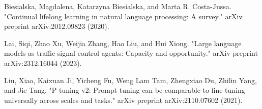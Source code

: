 \documentclass[runningheads]{llncs}
\begin{document}
\begin{thebibliography}{8}
Biesialska, Magdalena, Katarzyna Biesialska, and Marta R. Costa-Jussa. "Continual lifelong learning in natural language processing: A survey." arXiv preprint arXiv:2012.09823 (2020).

Lai, Siqi, Zhao Xu, Weijia Zhang, Hao Liu, and Hui Xiong. "Large language models as traffic signal control agents: Capacity and opportunity." arXiv preprint arXiv:2312.16044 (2023).

Liu, Xiao, Kaixuan Ji, Yicheng Fu, Weng Lam Tam, Zhengxiao Du, Zhilin Yang, and Jie Tang. "P-tuning v2: Prompt tuning can be comparable to fine-tuning universally across scales and tasks." arXiv preprint arXiv:2110.07602 (2021).
\end{thebibliography}
\end{document}
